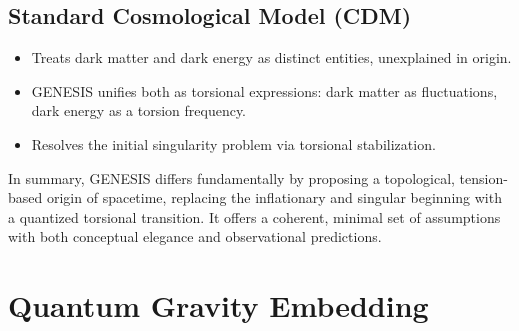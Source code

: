 \documentclass{article}
\begin{document}
\medskip
\begin{center}
\end{center}
\medskip


\subsection{Standard Cosmological Model (CDM)} \begin{itemize} \item Treats dark matter and dark energy as distinct entities, unexplained in origin. \item GENESIS unifies both as torsional expressions: dark matter as fluctuations, dark energy as a torsion frequency. \item Resolves the initial singularity problem via torsional stabilization. \end{itemize}

In summary, GENESIS differs fundamentally by proposing a topological, tension-based origin of spacetime, replacing the inflationary and singular beginning with a quantized torsional transition. It offers a coherent, minimal set of assumptions with both conceptual elegance and observational predictions.

\medskip
\begin{center}
\end{center}
\medskip



\section{Quantum Gravity Embedding}
\label{sec:quantum-gravity}
\end{document}
